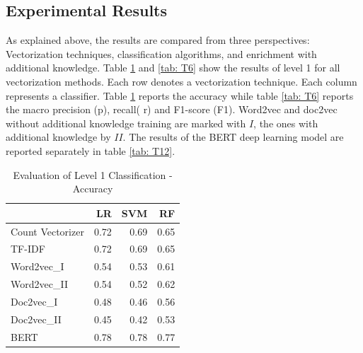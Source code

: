\documentclass[12pt, a4paper, titlepage]{article}
\begin{document}
\subsection{Experimental Results}
As explained above, the results are compared from three perspectives: Vectorization techniques, classification algorithms, and enrichment with additional knowledge. Table \ref{tab: T5} and \ref{tab: T6} show the results of level 1 for all vectorization methods. Each row denotes a vectorization technique. Each column represents a classifier. Table \ref{tab: T5} reports the accuracy while table \ref{tab: T6} reports the macro precision (p), recall( r) and F1-score (F1). Word2vec and doc2vec without additional knowledge training are marked with $I$, the ones with additional knowledge by $II$. The results of the \ac{BERT} deep learning model are reported separately in table \ref{tab: T12}. 


\begin{table}[hb!]
  \center
\begin{tabular}{lrrr} 
  \hline
  {} &    \textbf{LR} &   \textbf{SVM} &    \textbf{RF} \\
  \hline
Count Vectorizer &  0.72 &  0.69 &  0.65 \\
TF-IDF           &  0.72 &  0.69 &  0.65 \\
Word2vec\_I      &  0.54 &  0.53 &  0.61 \\
Word2vec\_II     &  0.54 &  0.52 &  0.62 \\
Doc2vec\_I       &  0.48 &  0.46 &  0.56 \\
Doc2vec\_II      &  0.45 &  0.42 &  0.53 \\
BERT            &  0.78 &  0.78 &  0.77 \\
  \hline
  \end{tabular}
  \caption{\label{tab: T5} Evaluation of Level 1 Classification - Accuracy}
\end{table}
\end{document}
